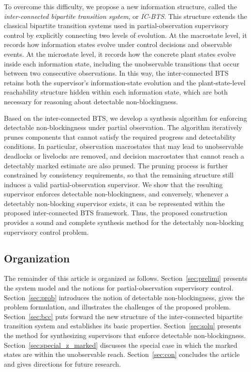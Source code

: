 \documentclass[twocolumn]{autart}
\begin{document}
To overcome this difficulty, we propose a new information structure, called the \emph{inter-connected bipartite transition system}, or \emph{IC-BTS}.
This structure extends the classical bipartite transition systems used in partial-observation supervisory control by explicitly connecting two levels of evolution.
At the macrostate level, it records how information states evolve under control decisions and observable events.
At the microstate level, it records how the concrete plant states evolve inside each information state, including the unobservable transitions that occur between two consecutive observations.
In this way, the inter-connected BTS retains both the supervisor's information-state evolution and the plant-state-level reachability structure hidden within each information state, which are both necessary for reasoning about detectable non-blockingness.

Based on the inter-connected BTS, we develop a synthesis algorithm for enforcing detectable non-blockingness under partial observation. The algorithm iteratively prunes components that cannot satisfy the required progress and detectability conditions. In particular, observation macrostates that may lead to unobservable deadlocks or livelocks are removed, and decision macrostates that cannot reach a detectably marked estimate are also pruned.
The pruning process is further constrained by consistency requirements, so that the remaining structure still induces a valid partial-observation supervisor.
We show that the resulting supervisor enforces detectable non-blockingness, and conversely, whenever a detectably non-blocking supervisor exists, it can be represented within the proposed inter-connected BTS framework.
Thus, the proposed construction provides a sound and complete synthesis method for the detectably non-blocking supervisory control problem.

\subsection{Organization}

The remainder of this article is organized as follows.
Section~\ref{sec:prelimi} presents the system model and the notions for partial-observation supervisory control.
Section~\ref{sec:prob} introduces the notion of detectable non-blockingness, gives the problem formulation, and illustrates the challenges of the proposed problem.
Section~\ref{sec:bcc} puts forward the new structure of the inter-connected bipartite transition system and establishes its basic properties.
Section~\ref{sec:solu} presents the method for synthesizing supervisors that enforce detectable non-blockingness.
Section~\ref{sec:special_z_marked} discusses the special case in which the marked states are within the unobservable reach.
Section~\ref{sec:con} concludes the article and gives directions for future research.
 
\end{document}
